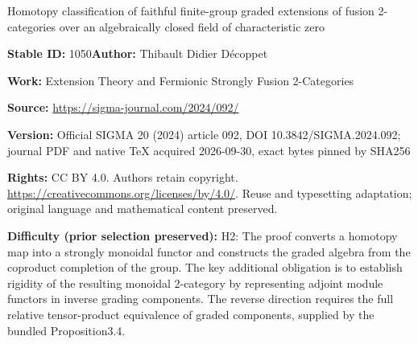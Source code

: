 \documentclass[11pt]{article}
\numberwithin{equation}{section}
\numberwithin{equation}{section}
\begin{document}
\begin{center}\Large Homotopy classification of faithful finite-group graded extensions of fusion 2-categories over an algebraically closed field of characteristic zero\end{center}
\noindent\textbf{Stable ID:} 1050\quad\textbf{Author:} Thibault Didier Décoppet\par
\noindent\textbf{Work:} Extension Theory and Fermionic Strongly Fusion 2-Categories\par
\noindent\textbf{Source:} \url{https://sigma-journal.com/2024/092/}\par
\noindent\textbf{Version:} Official SIGMA 20 (2024) article 092, DOI 10.3842/SIGMA.2024.092; journal PDF and native TeX acquired 2026-09-30, exact bytes pinned by SHA256\par
\noindent\textbf{Rights:} CC BY 4.0. Authors retain copyright. \url{https://creativecommons.org/licenses/by/4.0/}. Reuse and typesetting adaptation; original language and mathematical content preserved.\par
\noindent\textbf{Difficulty (prior selection preserved):} {\CJKfont H2: The proof converts a homotopy map into a strongly monoidal functor and constructs the graded algebra from the coproduct completion of the group. The key additional obligation is to establish rigidity of the resulting monoidal 2-category by representing adjoint module functors in inverse grading components. The reverse direction requires the full relative tensor-product equivalence of graded components, supplied by the bundled Proposition3.4.}\par
\end{document}
